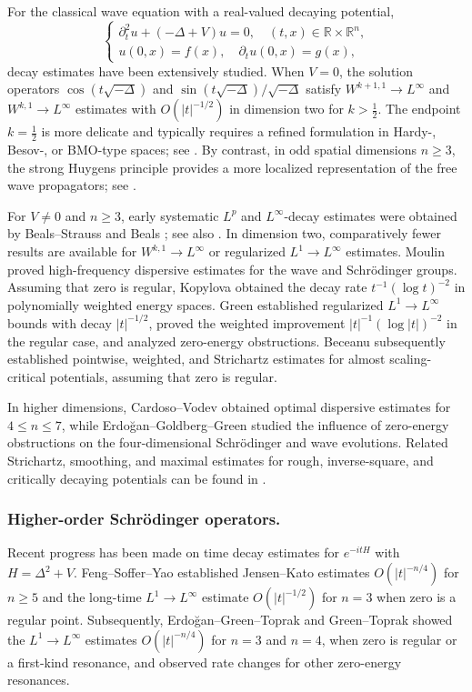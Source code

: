 \documentclass[reqno]{amsart}
\numberwithin{equation}{section}
\begin{document}
For the classical wave equation with a real-valued decaying potential,
\[
\left\{\begin{array}{l}
	\partial_t^2 u + (-\Delta + V) u = 0, \quad (t,x) \in \mathbb{R} \times \mathbb{R}^n, \\
	u(0,x) = f(x), \quad \partial_t u(0,x) = g(x),
\end{array}\right.
\]
decay estimates have been extensively studied. When $V=0$, the solution operators $\cos(t\sqrt{-\Delta})$ and $\sin(t\sqrt{-\Delta})/\sqrt{-\Delta}$ satisfy  $W^{k+1,1}\to L^\infty$ and $W^{k,1}\to L^\infty$ estimates  with $O(|t|^{-1/2})$  in dimension two for $k>\frac12$. The endpoint
\(k=\frac{1}{2}\) is more delicate and typically requires a refined
formulation in Hardy-, Besov-, or BMO-type spaces; see \cite{MSW,Green14}.   By contrast, in odd spatial dimensions \(n\ge3\), the strong Huygens principle
provides a more localized representation of the free wave
propagators; see \cite{Str05}.

For \(V\neq0\) and \(n\ge3\), early systematic \(L^p\) and
\(L^\infty\)-decay estimates were obtained by Beals--Strauss
\cite{B-S} and Beals \cite{Beals}; see also \cite{GV03,DP}.
In dimension two, comparatively fewer results are available for
\(W^{k,1}\to L^\infty\) or regularized \(L^1\to L^\infty\)
estimates. Moulin \cite{Mou} proved high-frequency dispersive
estimates for the wave and Schr\"odinger groups. Assuming that zero
is regular, Kopylova \cite{Kop} obtained the decay rate
\(t^{-1}(\log t)^{-2}\) in polynomially weighted energy spaces.
Green \cite{Green14} established regularized \(L^1\to L^\infty\)
bounds with decay \(|t|^{-1/2}\), proved the weighted improvement
\(|t|^{-1}(\log|t|)^{-2}\) in the regular case, and analyzed
zero-energy obstructions. Beceanu \cite{Bec16} subsequently established pointwise, weighted,
and Strichartz estimates for almost scaling-critical potentials,
assuming that zero is regular.


In higher dimensions, Cardoso--Vodev \cite{CV} obtained optimal
dispersive estimates for \(4\le n\le7\), while
Erdo\u{g}an--Goldberg--Green \cite{EGG14} studied the influence of
zero-energy obstructions on the four-dimensional Schr\"odinger and
wave evolutions. Related Strichartz, smoothing, and maximal estimates
for rough, inverse-square, and critically decaying potentials can be
found in \cite{Bec-Gold,GV95,BPSZ03,BPSZ04}.






\subsubsection{Higher-order Schr\"odinger operators.}
Recent progress has been made on time decay estimates for $e^{-itH}$ with $H=\Delta^2+V$. Feng--Soffer--Yao \cite{FSY} 
established Jensen--Kato  estimates  $O(|t|^{-n/4})$ for \(n\ge5\) and  the  long-time \(L^1\to L^\infty\)
estimate  $O(|t|^{-1/2})$  for $n=3$ when zero is a regular point. Subsequently, Erdo\u{g}an--Green--Toprak \cite{EGT19} and Green--Toprak \cite{GT19} showed the $L^1\to L^\infty$ estimates  $O(|t|^{-n/4})$  for $n=3$ and $n=4$, when zero is regular or a first-kind resonance, and observed rate changes for other zero-energy resonances.
\end{document}
